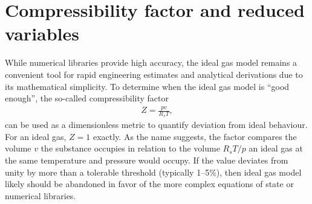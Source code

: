 \section{Compressibility factor and reduced variables}
While numerical libraries provide high accuracy, the ideal gas model remains a convenient tool for rapid engineering estimates and analytical derivations due to its mathematical simplicity. To determine when the ideal gas model is ``good enough'', the so-called compressibility factor 
\begin{align}
Z = \frac{pv}{R_sT},
\end{align}
can be used as a dimensionless metric to quantify deviation from ideal behaviour. For an ideal gas, $Z=1$ exactly. As the name suggests, the factor compares the volume $v$ the substance occupies in relation to the volume $R_sT/p$ an ideal gas at the same temperature and pressure would occupy. If the value deviates from unity by more than a tolerable threshold (typically 1--5\%), then ideal gas model likely should be abandoned in favor of the more complex equations of state or numerical libraries. 

